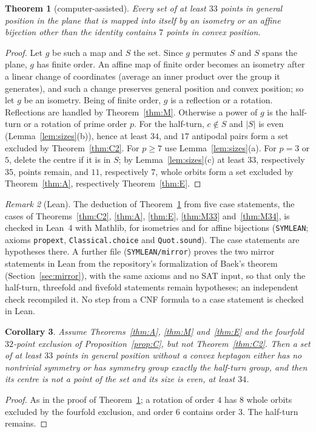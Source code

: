 \documentclass[11pt]{article}
\newtheorem{theorem}{Theorem}
\newtheorem{corollary}[theorem]{Corollary}
\theoremstyle{remark}
\newtheorem{remark}[theorem]{Remark}
\begin{document}
\begin{theorem}[computer-assisted]\label{thm:main}
Every set of at least $33$ points in general position in the plane that is mapped into itself by an isometry or an affine
bijection other than the identity contains $7$ points in convex position.
\end{theorem}
\begin{proof}
Let $g$ be such a map and $S$ the set. Since $g$ permutes $S$ and $S$ spans the plane, $g$ has finite order. An affine
map of finite order becomes an isometry after a linear change of coordinates (average an inner product over the group
it generates), and such a change preserves general position and convex position; so let $g$ be an isometry. Being of
finite order, $g$ is a reflection or a rotation. Reflections are handled by Theorem~\ref{thm:M}. Otherwise a power of
$g$ is the half-turn or a rotation of prime order $p$. For the half-turn, $c\notin S$ and $|S|$ is even
(Lemma~\ref{lem:sizes}(b)), hence at least $34$, and $17$ antipodal pairs form a set excluded by Theorem~\ref{thm:C2}.
For $p\ge7$ use Lemma~\ref{lem:sizes}(a). For $p=3$ or $5$, delete the centre if it is in $S$; by
Lemma~\ref{lem:sizes}(c) at least $33$, respectively $35$, points remain, and $11$, respectively $7$, whole orbits form a
set excluded by Theorem~\ref{thm:A}, respectively Theorem~\ref{thm:E}.
\end{proof}

\begin{remark}[Lean]\label{rem:lean}
The deduction of Theorem~\ref{thm:main} from five case statements, the cases of Theorems~\ref{thm:C2}, \ref{thm:A},
\ref{thm:E}, \ref{thm:M33} and~\ref{thm:M34}, is checked in Lean~4 with Mathlib, for isometries and for affine bijections
(\texttt{SYMLEAN}; axioms \texttt{propext}, \texttt{Classical.choice} and \texttt{Quot.sound}). The case statements are
hypotheses there. A further file (\texttt{SYMLEAN/mirror}) proves the two mirror statements in Lean from the
repository's formalization of Baek's theorem (Section~\ref{sec:mirror}), with the same axioms and no SAT input, so that
only the half-turn, threefold and fivefold statements remain hypotheses; an independent check recompiled it. No step
from a CNF formula to a case statement is checked in Lean.
\end{remark}

\begin{corollary}\label{cor:only}
Assume Theorems~\ref{thm:A}, \ref{thm:M} and~\ref{thm:E} and the fourfold $32$-point exclusion of
Proposition~\ref{prop:C}, but not Theorem~\ref{thm:C2}. Then a set of at least $33$ points in general position without a
convex heptagon either has no nontrivial symmetry or has symmetry group exactly the half-turn group, and then its centre
is not a point of the set and its size is even, at least $34$.
\end{corollary}
\begin{proof}
As in the proof of Theorem~\ref{thm:main}; a rotation of order $4$ has $8$ whole orbits excluded by the fourfold
exclusion, and order $6$ contains order $3$. The half-turn remains.
\end{proof}
\end{document}
